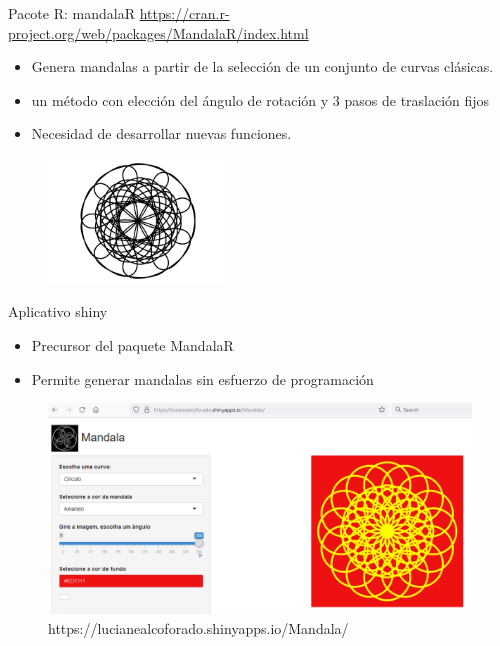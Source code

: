 \documentclass[
  ignorenonframetext,
]{beamer}
\begin{document}
\begin{frame}{Pacote R: mandalaR}
\protect\hypertarget{pacote-r-mandalar}{}
\url{https://cran.r-project.org/web/packages/MandalaR/index.html}

\begin{itemize}
\item
  Genera mandalas a partir de la selección de un conjunto de curvas
  clásicas.
\item
  un método con elección del ángulo de rotación y 3 pasos de traslación
  fijos
\item
  Necesidad de desarrollar nuevas funciones.
\end{itemize}

\begin{figure}

{\centering \includegraphics[width=1.875in,height=\textheight]{Teste_quarto_files/figure-beamer/unnamed-chunk-6-1.pdf}

}

\end{figure}
\end{frame}

\begin{frame}{Aplicativo shiny}
\protect\hypertarget{aplicativo-shiny}{}
\begin{itemize}
\item
  Precursor del paquete MandalaR
\item
  Permite generar mandalas sin esfuerzo de programación
\end{itemize}

\begin{figure}

{\centering \includegraphics{FigurasLatinR2023/shiny_mandala.png}

}

\caption{https://lucianealcoforado.shinyapps.io/Mandala/}

\end{figure}
\end{frame}
\end{document}
